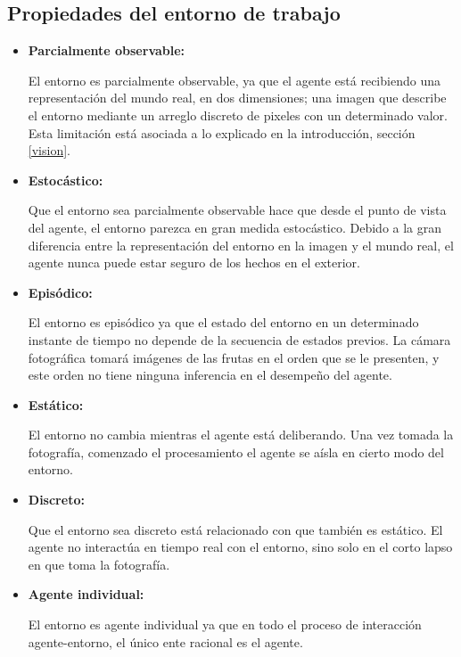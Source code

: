 \documentclass[10pt,a4paper]{article}
\begin{document}
\subsection{Propiedades del entorno de trabajo}
\begin{itemize}
\item \textbf{Parcialmente observable:}

El entorno es parcialmente observable, ya que el agente está recibiendo una representación del mundo real, en dos dimensiones; una imagen que describe el entorno mediante un arreglo discreto de pixeles con un determinado valor. Esta limitación está asociada a lo explicado en la introducción, sección \ref{vision}.

\item \textbf{Estocástico:}

Que el entorno sea parcialmente observable hace que desde el punto de vista del agente, el entorno parezca en gran medida estocástico. Debido a la gran diferencia entre la representación del entorno en la imagen y el mundo real, el agente nunca puede estar seguro de los hechos en el exterior.  

\item \textbf{Episódico:}

El entorno es episódico ya que el estado del entorno en un determinado instante de tiempo no depende de la secuencia de estados previos. La cámara fotográfica tomará imágenes de las frutas en el orden que se le presenten, y este orden no tiene ninguna inferencia en el desempeño del agente.

\item \textbf{Estático:}

El entorno no cambia mientras el agente está deliberando. Una vez tomada la fotografía, comenzado el procesamiento el agente se aísla en cierto modo del entorno.

\item \textbf{Discreto:}

Que el entorno sea discreto está relacionado con que también es estático. El agente no interactúa en tiempo real con el entorno, sino solo en el corto lapso en que toma la fotografía.

\item \textbf{Agente individual:}

El entorno es agente individual ya que en todo el proceso de interacción agente-entorno, el único ente racional es el agente.

\end{itemize}
\end{document}
